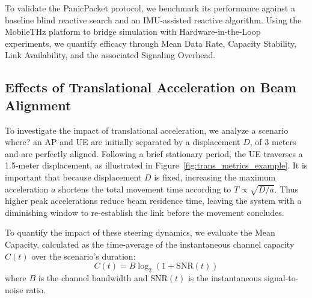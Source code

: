 \documentclass[fleqn,10pt]{wlscirep}
\begin{document}
To validate the PanicPacket protocol, we benchmark its performance against a baseline blind reactive search and an IMU-assisted reactive algorithm. Using the MobileTHz platform to bridge simulation with Hardware-in-the-Loop experiments, we quantify efficacy through Mean Data Rate, Capacity Stability, Link Availability, and the associated Signaling Overhead.

\subsection*{Effects of Translational Acceleration on Beam Alignment}

To investigate the impact of translational acceleration, we analyze a scenario where? an AP and UE are initially separated by a displacement $D$, of 3 meters and are perfectly aligned. Following a brief stationary period, the UE traverses a 1.5-meter displacement, as illustrated in Figure~\ref{fig:trans_metrics_example}. It is important that because displacement $D$ is fixed, increasing the maximum acceleration $a$ shortens the total movement time according to $T \propto \sqrt{D/a}$. Thus higher peak accelerations reduce beam residence time, leaving the system with a diminishing window to re-establish the link before the movement concludes.

To quantify the impact of these steering dynamics, we evaluate the Mean Capacity, calculated as the time-average of the instantaneous channel capacity $C(t)$ over the scenario's duration:
\begin{equation}
    C(t) = B \log_2(1 + \text{SNR}(t))
\end{equation}
where $B$ is the channel bandwidth and $\text{SNR}(t)$ is the instantaneous signal-to-noise ratio.
\end{document}
